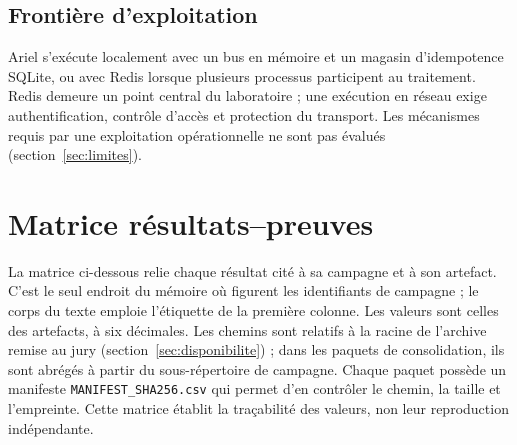 \subsection{Frontière d'exploitation}

Ariel \logminer{} s'exécute localement avec un bus en mémoire et un magasin d'idempotence
SQLite, ou avec Redis lorsque plusieurs processus participent au traitement. Redis demeure
un point central du laboratoire ; une exécution en réseau exige authentification, contrôle
d'accès et protection du transport. Les mécanismes requis par une exploitation
opérationnelle ne sont pas évalués (section~\ref{sec:limites}).

\section{Matrice résultats--preuves}

La matrice ci-dessous relie chaque résultat cité à sa campagne et à son artefact. C'est le
seul endroit du mémoire où figurent les identifiants de campagne ; le corps du texte emploie
l'étiquette de la première colonne. Les valeurs sont celles des artefacts, à six décimales.
Les chemins sont relatifs à la racine de l'archive remise au jury (section~\ref{sec:disponibilite}) ; dans les paquets de consolidation, ils sont
abrégés à partir du sous-répertoire de campagne. Chaque paquet possède un manifeste
\texttt{MANIFEST\_SHA256.csv} qui permet d'en contrôler le chemin, la taille et l'empreinte.
Cette matrice établit la traçabilité des valeurs, non leur reproduction indépendante.

